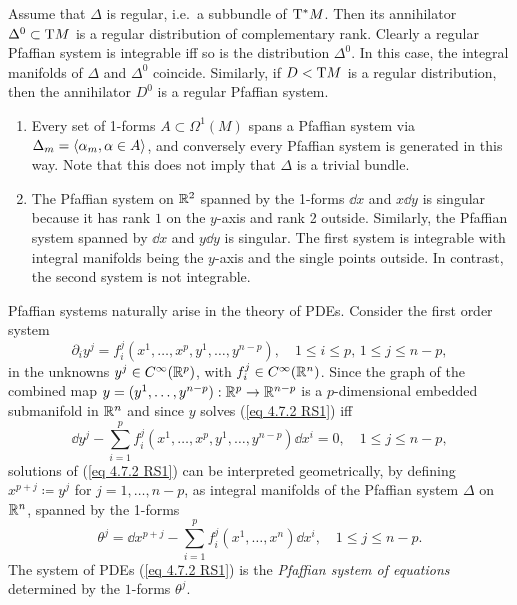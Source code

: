 \begin{rem}
    Assume that $\Delta$ is regular, i.e.~a subbundle of $\mathrm{T}^\ast M$. Then its annihilator $\Delta^0\subset \mathrm{T} M$ is a regular distribution of complementary rank. Clearly a regular Pfaffian system is integrable iff so is the distribution $\Delta^0$. In this case, the integral manifolds of $\Delta$ and $\Delta^0$ coincide. Similarly, if $D< \mathrm{T} M$ is a regular distribution, then the annihilator $D^0$ is a regular Pfaffian system.
\end{rem}

\begin{example}
    \begin{enumerate}
        \item Every set of 1-forms $A\subset \Omega^1(M)$ spans a Pfaffian system via $\Delta_m=\langle\alpha_m,\alpha\in A\rangle$, and conversely every Pfaffian system is generated in this way. Note that this does not imply that $\Delta$ is a trivial bundle.
        \item The Pfaffian system on $\mathbb{R}^2$ spanned by the 1-forms $\dd x$ and $x\dd y$ is singular because it has rank $1$ on the $y$-axis and rank 2 outside. Similarly, the Pfaffian system spanned by $\dd x$ and $y\dd y$ is singular. The first system is integrable with integral manifolds being the $y$-axis and the single points outside. In contrast, the second system is not integrable.
    \end{enumerate}
\end{example}

Pfaffian systems naturally arise in the theory of PDEs. Consider the first order system
\[\partial_i y^j=f_i^j(x^1,\ldots,x^p,y^1,\ldots,y^{n-p}),\quad 1\leq i\leq p,\,1\leq j\leq n-p,\label{eq 4.7.2 RS1}\]
in the unknowns $y^j\in C^\infty(\mathbb{R}^p)$, with $f_i^j\in C^\infty(\mathbb{R}^n)$. Since the graph of the combined map $y=(y^1,\ldots,y^{n-p}):\mathbb{R}^p\to \mathbb{R}^{n-p}$ is a $p$-dimensional embedded submanifold in $\mathbb{R}^n$ and since $y$ solves (\ref{eq 4.7.2 RS1}) iff
\[\dd y^j-\sum_{i=1}^p f_i^j(x^1,\ldots,x^p,y^1,\ldots,y^{n-p})\dd x^i=0,\quad 1\leq j\leq n-p,\]
solutions of (\ref{eq 4.7.2 RS1}) can be interpreted geometrically, by defining $x^{p+j}\coloneqq y^j$ for $j=1,\ldots,n-p$, as integral manifolds of the Pfaffian system $\Delta$ on $\mathbb{R}^n$, spanned by the 1-forms
\[\theta^j=\dd x^{p+j}-\sum_{i=1}^p f_i^j(x^1,\ldots,x^n)\dd x^i,\quad 1\leq j\leq n-p.\]
The system of PDEs (\ref{eq 4.7.2 RS1}) is the \emph{Pfaffian system of equations} determined by the $1$-forms $\theta^j$.

